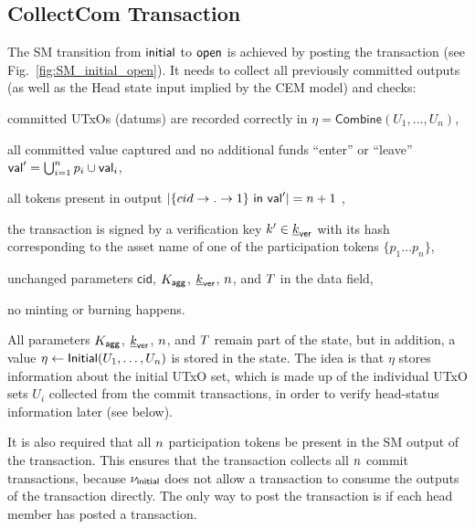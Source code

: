 \subsection{CollectCom Transaction} 



The SM transition from $\mathsf{initial}$ to
$\mathsf{open}$ is achieved by posting the \mtxCCom{} transaction (see
Fig.~\ref{fig:SM_initial_open}). It needs to collect all previously committed
outputs (as well as the Head state input implied by the CEM model) and checks:

\begin{menumerate}
  \item committed UTxOs (datums) are recorded correctly in
  $\eta = \mathsf{Combine}(U_{1}, \ldots, U_{n})$,
  \item all committed value captured and no additional funds ``enter'' or ``leave''
  $\mathsf{val}' = \bigcup_{i=1}^{n} p_{i} \cup \mathsf{val}_{i}$,
  \item all tokens present in output
  $|\{cid \rightarrow . \rightarrow 1\} ~ \mathsf{in} ~ \mathsf{val}'| = n + 1$
  ,
  \item the transaction is signed by a verification key $k' \in \underline{k}_{\mathsf{ver}}$ with its
  hash corresponding to the asset name of one of the participation tokens
  $\{p_1 \dots p_n\}$,
  \item unchanged parameters $\mathsf{cid}$, $K_{\mathsf{agg}}$, $\underline{k}_{\mathsf{ver}}$, $n$, and
  $T$ in the data field,
  \item no minting or burning happens.
\end{menumerate}

All parameters $K_{\mathsf{agg}}$, $\underline{k}_{\mathsf{ver}}$, $n$, and $T$ remain part of the state,
but in addition, a value $\eta \gets \mathsf{Initial}(U_1,\ldots,U_n)$ is stored in
the state. The idea is that $\eta$ stores information about the initial UTxO
set, which is made up of the individual UTxO sets $U_i$ collected from the
commit transactions, in order to verify head-status information later (see
below).

It is also required that all $n$ participation tokens be present in the SM
output of the \mtxCollect{} transaction. This ensures that the \mtxCollect{}
transaction collects all $n$ commit transactions, because $\nu_\mathsf{initial}$ does
not allow a \mtxCollect{} transaction to consume the outputs of the \mtxInit{}
transaction directly. The only way to post the \mtxCollect{} transaction is if
each head member has posted a \mtxCommit{} transaction.


